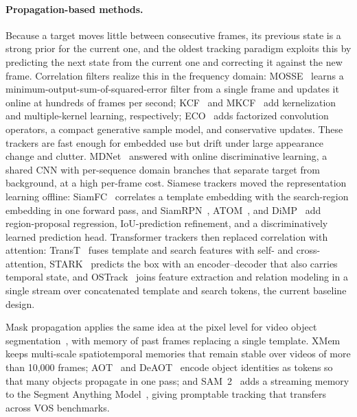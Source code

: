 \paragraph{Propagation-based methods.}
Because a target moves little between consecutive frames, its previous state is a strong prior for the current one, and the oldest tracking paradigm exploits this by predicting the next state from the current one and correcting it against the new frame. Correlation filters realize this in the frequency domain: MOSSE~\cite{bolme2010visual} learns a minimum-output-sum-of-squared-error filter from a single frame and updates it online at hundreds of frames per second; KCF~\cite{henriques2014high} and MKCF~\cite{tang2015multi} add kernelization and multiple-kernel learning, respectively; ECO~\cite{DanelljanBKF17} adds factorized convolution operators, a compact generative sample model, and conservative updates. These trackers are fast enough for embedded use but drift under large appearance change and clutter. MDNet~\cite{NamH16} answered with online discriminative learning, a shared CNN with per-sequence domain branches that separate target from background, at a high per-frame cost. Siamese trackers moved the representation learning offline: SiamFC~\cite{BertinettoVHVT16} correlates a template embedding with the search-region embedding in one forward pass, and SiamRPN~\cite{LiYWZH18}, ATOM~\cite{DanelljanBKF19}, and DiMP~\cite{BhatDGT19} add region-proposal regression, IoU-prediction refinement, and a discriminatively learned prediction head. Transformer trackers then replaced correlation with attention: TransT~\cite{ChenYZ0YL21} fuses template and search features with self- and cross-attention, STARK~\cite{0002PF0L21} predicts the box with an encoder--decoder that also carries temporal state, and OSTrack~\cite{YeCMSC22} joins feature extraction and relation modeling in a single stream over concatenated template and search tokens, the current baseline design.

Mask propagation applies the same idea at the pixel level for video object segmentation~\cite{pont20172017,xu2018youtube}, with memory of past frames replacing a single template. XMem~\cite{ChengS22XMem} keeps multi-scale spatiotemporal memories that remain stable over videos of more than 10{,}000 frames; AOT~\cite{YangWY21aot} and DeAOT~\cite{YangY22adeaot} encode object identities as tokens so that many objects propagate in one pass; and SAM~2~\cite{ravi2024sam2} adds a streaming memory to the Segment Anything Model~\cite{kirillov2023sam}, giving promptable tracking that transfers across VOS benchmarks.


